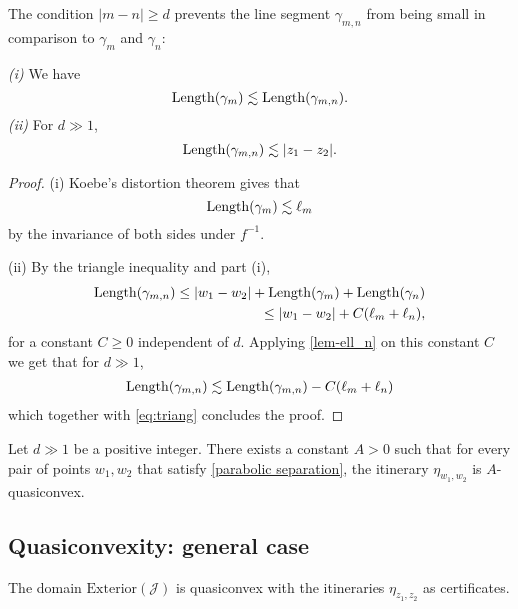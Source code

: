 The condition $|m-n| \geq d$ prevents the line segment $\gamma _{m,n}$ from being small in comparison to $\gamma_m$ and $\gamma_n$:
\begin{proposition} \leavevmode
	\emph{(i)} We have \begin{equation}
		\operatorname{Length}(\gamma_m) \lesssim \operatorname{Length}(\gamma_{m,n}).
	\end{equation}
	\emph{(ii)} For $d \gg 1$, 
	\begin{equation}
		\operatorname{Length}(\gamma_{m,n}) \lesssim |z_1-z_2|.
	\end{equation}
\end{proposition}

\begin{proof}
(i) 	Koebe's distortion theorem gives that 
\begin{equation}
		\operatorname{Length}(\gamma_m) \lesssim \ell_m
	\end{equation}
	by the invariance of both sides under $f^{-1}$.

(ii) By the triangle inequality and part (i),
\begin{align} \label{eq:triang}
	\begin{split}
	\Length(\gamma_{m,n}) \leq |w_1-w_2|+\Length(\gamma_m)+\Length(\gamma_n) %
	\\ \leq |w_1-w_2|+C(\ell_m + \ell_n),
	\end{split}
\end{align}
for a constant $C \geq 0$ independent of $d$. Applying \cref{lem-ell_n} on this constant $C$ we get that for $d \gg 1$, 
\begin{align*}
\operatorname{Length}(\gamma_{m,n}) \lesssim \operatorname{Length}(\gamma_{m,n}) - C(\ell_m + \ell _n)
\end{align*}
which together with \eqref{eq:triang} concludes the proof.
\end{proof}

\begin{corollary}
	Let $d \gg 1$ be a positive integer. There exists a constant $A>0$ such that for every pair of points $w_1,w_2$ that satisfy \cref{parabolic separation}, the itinerary $\eta_{w_1,w_2}$ is $A$-quasiconvex.
\end{corollary}

\subsection{Quasiconvexity: general case}

\begin{theorem} \label{quasiconvex-cauliflower} %
	\begin{enumerate}[label=\normalfont(\roman*)]
	The domain $\mathrm{Exterior}(\mathcal{J})$ is quasiconvex with the itineraries $\eta_{z_1,z_2}$ as certificates.
	\end{enumerate}
\end{theorem}

